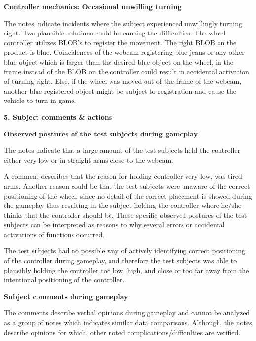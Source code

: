 \noindent \textbf{Controller mechanics: Occasional unwilling turning} \newline

The notes indicate incidents where the subject experienced unwillingly turning right. 
Two plausible solutions could be causing the difficulties. 
The wheel controller utilizes BLOB’s to register the movement. 
The right BLOB on the product is blue. Coincidences of the webcam registering blue jeans or any other blue object which is larger than the desired blue object on the wheel, in the frame instead of the BLOB on the controller could result in accidental activation of turning right. 
Else, if the wheel was moved out of the frame of the webcam, another blue registered object might be subject to registration and cause the vehicle to turn in game.
\bigskip

\noindent\textbf{5. Subject comments \& actions}\newline
\bigskip

\noindent \textbf{Observed postures of the test subjects during gameplay.}\newline

The notes indicate that a large amount of the test subjects held the controller either very low or in straight arms close to the webcam.


A comment describes that the reason for holding controller very low, was tired arms. 
Another reason could be that the test subjects were unaware of the correct positioning of the wheel, since no detail of the correct placement is showed during the gameplay thus resulting in the subject holding the controller where he/she thinks that the controller should be. 
These specific observed postures of the test subjects can be interpreted as reasons to why several errors or accidental activations of functions occurred.


The test subjects had no possible way of actively identifying correct positioning of the controller during gameplay, and therefore the test subjects was able to plausibly holding the controller too low, high, and close or too far away from the intentional positioning of the controller. 
\bigskip

\noindent \textbf{Subject comments during gameplay}\newline

The comments describe verbal opinions during gameplay and cannot be analyzed as a group of notes which indicates similar data comparisons. 
Although, the notes describe opinions for which, other noted complications/difficulties are verified.

